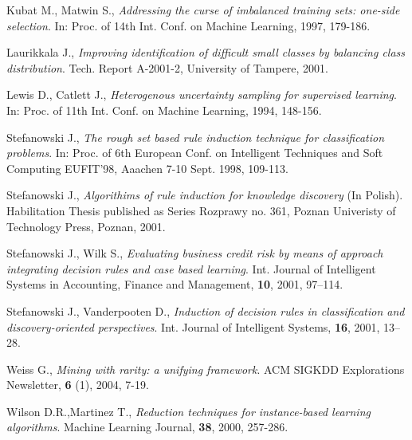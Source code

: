 \documentclass{AIMeth05}
\begin{document}
\begin{thebibliography}{17}
 Kubat M., Matwin S., \emph{Addressing the curse of imbalanced
training sets: one-side selection}. In: Proc. of 14th Int. Conf. on Machine
Learning, 1997, 179-186.

 Laurikkala J., \emph{Improving identification of difficult small
classes by balancing class distribution}. Tech. Report A-2001-2, University
of Tampere, 2001.

 Lewis D., Catlett J., \emph{Heterogenous uncertainty sampling for
supervised learning}. In: Proc. of 11th Int. Conf. on Machine Learning,
1994, 148-156.





 Stefanowski J.,  \emph{The rough set based rule induction
technique for classification problems}. In: Proc. of 6th European Conf. on
Intelligent Techniques and Soft Computing EUFIT'98, Aaachen 7-10 Sept. 1998,
109-113.



 Stefanowski J.,
\emph{Algorithims of rule induction for knowledge discovery} (In Polish).
Habilitation Thesis published as Series Rozprawy no. 361, Poznan Univeristy
of Technology Press, Poznan, 2001.


 Stefanowski J., Wilk S., \emph{Evaluating business credit risk
by means of approach integrating decision rules and case based learning}.
Int. Journal of Intelligent Systems in Accounting, Finance and Management,
\textbf{10}, 2001, 97--114.



 Stefanowski J., Vanderpooten D.,  \emph{Induction of decision rules in
classification and discovery-oriented perspectives}. Int. Journal of
Intelligent Systems, \textbf{16}, 2001, 13--28.


 Weiss G., \emph{Mining with rarity: a unifying framework}.
ACM SIGKDD Explorations Newsletter,  \textbf{6} (1), 2004, 7-19.

 Wilson D.R.,Martinez T., \emph{Reduction techniques for
instance-based learning algorithms}. Machine Learning Journal, \textbf{38},
2000, 257-286.


\end{thebibliography}
\end{document}
